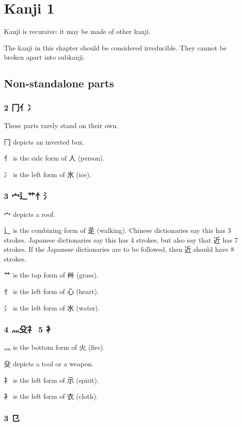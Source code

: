 \chapter{Kanji 1}

Kanji is recursive: it may be made of other kanji.

The kanji in this chapter should be considered irreducible.
They cannot be broken apart into subkanji.

\section{Non-standalone parts}

\subsection{2 冂亻冫}

These parts rarely stand on their own.

冂 depicts an inverted box.

亻 is the side form of 人 (person).

冫 is the left form of 氷 (ice).

\subsection{3 宀辶艹忄氵}

宀 depicts a roof.

辶 is the combining form of 辵 (walking).
Chinese dictionaries say this has 3 strokes.
Japanese dictionaries say this has 4 strokes,
but also say that 近 has 7 strokes.
If the Japanese dictionaries are to be followed,
then 近 should have 8 strokes.

艹 is the top form of 艸 (grass).

忄 is the left form of 心 (heart).

氵 is the left form of 水 (water).

\subsection{4 灬殳礻 5 衤}

灬 is the bottom form of 火 (fire).

殳 depicts a tool or a weapon.

礻 is the left form of ⽰ (spirit).

衤 is the left form of 衣 (cloth).

\subsection{3 㔾}

